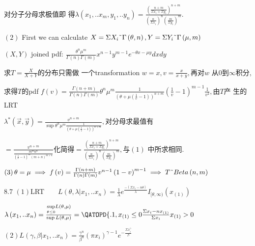 \documentclass{article}
\begin{document}
对分子分母求极值即%
得$\lambda \left( x_{1},..x_{m},y_{1},..y_{n}\right) =\frac{\left( 
\frac{n+m}{\Sigma x_{i}+\Sigma y_{i}}\right) ^{n+m}}{\left( \frac{n}{\Sigma
x_{i}}\right) ^{n}\left( \frac{m}{\Sigma y_{i}}\right) ^{m}}.$

$\left( 2\right) $ First we can calculate $X=\Sigma X_{i}\symbol{126}\Gamma
\left( \theta ,n\right) ,Y=\Sigma Y_{i}\symbol{126}\Gamma \left( \mu
,m\right) $

$\left( X,Y\right) $ joined pdf: $\frac{\theta ^{n}\mu ^{m}}{\Gamma \left(
n\right) \Gamma \left( m\right) }x^{n-1}y^{m-1}e^{-\theta x-\mu y}dxdy$

求$T=\frac{X}{X+Y}$的分布只需做%
一个transformation $w=x,v=\frac{x}{x+y},$再对$w$%
从0到$\infty $积分,

求得$T$的pdf $f\left( v\right) =\frac{\Gamma \left(
n+m\right) }{\Gamma \left( n\right) \Gamma \left( m\right) }\theta ^{n}\mu
^{m}\frac{1}{\left( \theta +\mu \left( \frac{1}{v}-1\right) \right) ^{n+m}}%
\left( \frac{1}{v}-1\right) ^{m-1}\frac{1}{v^{2}},$由$T$产%
生的LRT

$\lambda ^{\ast }\left( \vec{x},\vec{y}\right) =\frac{v^{n+m}}{\sup \theta
^{n}\mu ^{m}\frac{1}{\left( \theta +\mu \left( \frac{1}{v}-1\right) \right)
^{n+m}}},$对分母求最值有

$=\frac{v^{n+m}}{\frac{m^{m}n^{n}}{\left( \frac{1}{v}-1\right) ^{m}\left(
m+n\right) ^{m+n}}}$化简得$=\frac{\left( \frac{n+m}{\Sigma
x_{i}+\Sigma y_{i}}\right) ^{n+m}}{\left( \frac{n}{\Sigma x_{i}}\right)
^{n}\left( \frac{m}{\Sigma y_{i}}\right) ^{m}},$与$\left( 1\right) $%
中所求相同$.$

$\left( 3\right) \theta =\mu \implies f\left( v\right) =\frac{\Gamma \left(
n+m\right) }{\Gamma \left( n\right) \Gamma \left( m\right) }v^{n-1}\left(
1-v\right) ^{m-1}\implies T\symbol{126}Beta\left( n,m\right) $

8.7 $\left( 1\right) $LRT$\qquad L\left( \theta ,\lambda
|x_{1},..x_{n}\right) =\frac{1}{\lambda }e^{\frac{-\left( \Sigma
x_{i}-n\theta \right) }{\lambda }}I_{[\theta ,\infty )}\left( x_{\left(
1\right) }\right) $

$\lambda \left( x_{1},..x_{n}\right) =\frac{\underset{\theta \leq 0}{\sup }%
L\left( \theta ,\mu \right) }{\sup L\left( \theta ,\mu \right) }=\QATOPD\{ .
{1,x_{\left( 1\right) }\leq 0}{\frac{\Sigma x_{i}-nx_{\left( 1\right) }}{%
\Sigma x_{i}}x_{\left( 1\right) }>0}$

$\left( 2\right) L\left( \gamma ,\beta |x_{1},..x_{n}\right) =\frac{\gamma
^{n}}{\beta ^{n}}\left( \pi x_{i}\right) ^{\gamma -1}e^{-\frac{\Sigma
x_{i}^{\gamma }}{\beta }}$
\end{document}

